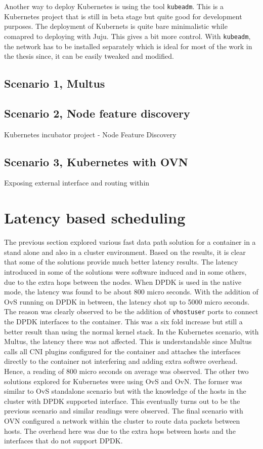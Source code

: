 \documentclass[english, 12pt, a4paper, elec, utf8, a-1b, online]{aaltothesis}
\begin{document}
Another way to deploy Kubernetes is using the tool \lstinline{kubeadm}. This is a Kubernetes project that is still in beta stage but quite good for development purposes. The deployment of Kubernets is quite bare minimalistic while comapred to deploying with Juju. This gives a bit more control. With \lstinline{kubeadm}, the network has to be installed separately which is ideal for most of the work in the thesis since, it can be easily tweaked and modified.


\subsection{Scenario 1, Multus}
\subsection{Scenario 2, Node feature discovery}
Kubernetes incubator project - Node Feature Discovery
\subsection{Scenario 3, Kubernetes with OVN}
Exposing external interface and routing within


\clearpage
\section{Latency based scheduling}
The previous section explored various fast data path solution for a container in a stand alone and also in a cluster environment. Based on the results, it is clear that some of the solutions provide much better latency results. The latency introduced in some of the solutions were software induced and in some others, due to the extra hops between the nodes. When DPDK is used in the native mode, the latency was found to be about 800 micro seconds. With the addition of OvS running on DPDK in between, the latency shot up to 5000 micro seconds. The reason was clearly observed to be the addition of \lstinline{vhostuser} ports to connect the DPDK interfaces to the container. This was a six fold increase but still a better result than using the normal kernel stack. In the Kubernetes scenario, with Multus, the latency there was not affected. This is understandable since Multus calls all CNI plugins configured for the container and attaches the interfaces directly to the container not interfering and adding extra softwre overhead. Hence, a reading of 800 micro seconds on average was observed. The other two solutions explored for Kubernetes were using OvS and OvN. The former was similar to OvS standalone scenario but with the knowledge of the hosts in the cluster with DPDK supported interface. This eventually turns out to be the previous scenario and similar readings were observed. The final scenario with OVN configured a network within the cluster to route data packets between hosts. The overhead here was due to the extra hops between hosts and the interfaces that do not support DPDK.
\end{document}
